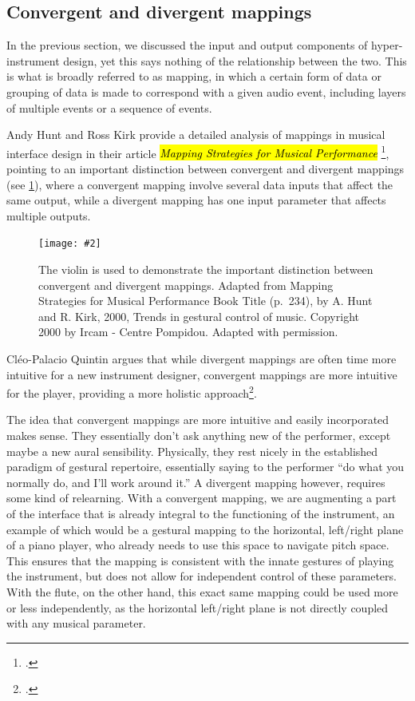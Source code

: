 \documentclass[12pt,twoside,maitrise]{dms_ks}
\newcommand{\customincludegraphics}[4][]{%
    \begin{figure}[H]
        \centering
        \texttt{[image: \#2]}
        \caption{#4}
	\label{#3} 
    \end{figure}
}
\theoremstyle{definition}
\begin{document}
{{\subsection{Convergent and divergent mappings}

In the previous section, we discussed the input and output components of hyper-instrument design, yet this says nothing of the relationship between the two.
This is what is broadly referred to as mapping, in which a certain form of data or grouping of data is made to correspond with a given audio event, including layers of multiple events or a sequence of events. 

Andy Hunt and Ross Kirk provide a detailed analysis of mappings in musical interface design in their article \hl{\textit{Mapping Strategies for Musical Performance}} \footcite{hunt_mapping_2000}, pointing to an important distinction between convergent and divergent mappings (see \cref{fig:mapping}), where a convergent mapping involve several data inputs that affect the same output, while a divergent mapping has one input parameter that affects multiple outputs. 


\customincludegraphics[scale=1]{mapping.png}{fig:mapping}{The violin is used to demonstrate the important distinction between convergent and divergent mappings. Adapted from Mapping Strategies for Musical Performance Book Title (p.~234), by A. Hunt and R. Kirk, 2000, Trends in gestural control of music. Copyright 2000 by Ircam - Centre Pompidou. Adapted with permission.}

Cléo-Palacio Quintin argues that while divergent mappings are often time more intuitive for a new instrument designer, convergent mappings are more intuitive for the player, providing a more holistic approach\footcite[44--45]{palacio-quintin_composition_2012-1}. 

The idea that convergent mappings are more intuitive and easily incorporated makes sense. 
They essentially don't ask anything new of the performer, except maybe a new aural sensibility. 
Physically, they rest nicely in the established paradigm of gestural repertoire, essentially saying to the performer “do what you normally do, and I'll work around it.” A divergent mapping however, requires some kind of relearning. 
With a convergent mapping, we are augmenting a part of the interface that is already integral to the functioning of the instrument, an example of which would be a gestural mapping to the horizontal, left/right plane of a piano player, who already needs to use this space to navigate pitch space.
This ensures that the mapping is consistent with the innate gestures of playing the instrument, but does not allow for independent control of these parameters.
With the flute, on the other hand, this exact same mapping could be used more or less independently, as the horizontal left/right plane is not directly coupled with any musical parameter.

}}
\end{document}
